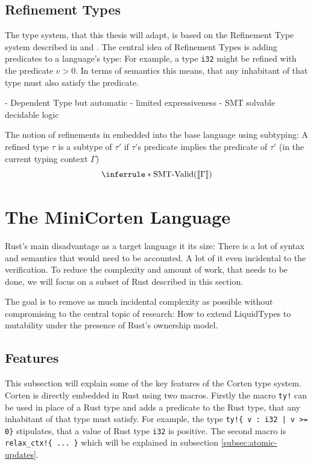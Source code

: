 \documentclass{book}
\newcommand{\code}[1]{\texttt{#1}}
\theoremstyle{definition}
\begin{document}
\section{Refinement Types}

The type system, that this thesis will adapt, is based on the Refinement Type system described in \cite{vazou_abstract_2013} and \cite{rondon_liquid_2008}. 
The central idea of Refinement Types is adding predicates to a language's type: For example, a type \code{i32} might be refined with the predicate $v > 0$. In terms of semantics this means, that any inhabitant of that type must also satisfy the predicate. 

- Dependent Type but automatic
- limited expressiveness
- SMT solvable decidable logic

The notion of refinements in embedded into the base language using subtyping: A refined type $\tau$ is a subtype of $\tau'$ if $\tau$'s predicate implies the predicate of $\tau'$ (in the current typing context $\Gamma$)
\begin{equation*}
  \inferrule*
    {\text{SMT-Valid}(\llbracket \Gamma \rrbracket)}
    {}
\end{equation*}


\chapter{The MiniCorten Language}

Rust's main disadvantage as a target language it its size: There is a lot of syntax and semantics that would need to be accounted. A lot of it even incidental to the verification. To reduce the complexity and amount of work, that needs to be done, we will focus on a subset of Rust described in this section.

The goal is to remove as much incidental complexity as possible without compromising to the central topic of research: How to extend LiquidTypes to mutability under the presence of Rust's ownership model.

\section{Features}

This subsection will explain some of the key features of the Corten type system.
Corten is directly embedded in Rust using two macros. Firstly the macro \code{ty!} can be used in place of a Rust type and adds a predicate to the Rust type, that any inhabitant of that type must satisfy. For example, the type \code{ty!\{ v : i32 | v >= 0\}} stipulates, that a value of Rust type \code{i32} is positive. The second macro is \code{relax\_ctx!\{ ... \}} which will be explained in subsection \ref{subsec:atomic-updates}.
\end{document}
